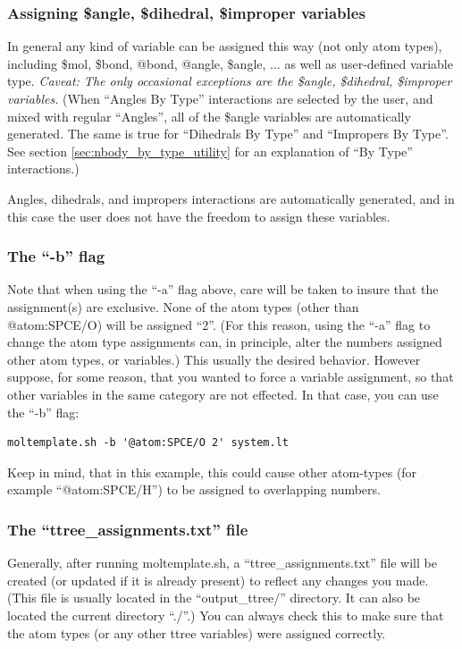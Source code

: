 \documentclass[11pt]{article}
\begin{document}
\subsubsection*{Assigning \$angle, \$dihedral, \$improper variables}
In general any kind of variable can be assigned this way (not only atom types),
including \$mol, \$bond, @bond, @angle, \$angle, ...
as well as user-defined variable type.
\textit{Caveat: The only occasional exceptions are the
\$angle, \$dihedral, \$improper variables.}
(When ``Angles By Type'' interactions are selected by the user,
and mixed with regular ``Angles'',
all of the \$angle variables are automatically generated.  
The same is true for ``Dihedrals By Type'' and ``Impropers By Type''.
See section \ref{sec:nbody_by_type_utility} for an explanation of 
``By Type'' interactions.)


Angles, dihedrals, and impropers interactions are automatically generated, and 
in this case the user does not have the freedom to assign these variables.

\subsubsection*{The ``-b'' flag}
Note that when using the ``-a'' flag above, care will be taken to 
insure that the assignment(s) are exclusive. 
None of the atom types (other than @atom:SPCE/O) will be assigned ``2''. 
(For this reason, using the ``-a'' flag to change the atom type 
 assignments can, in principle, alter the numbers assigned 
 other atom types, or variables.)
This usually the desired behavior. 
However suppose, for some reason, that you wanted to 
force a variable assignment, so that other 
variables in the same category are not effected. 
In that case, you can use the ``-b'' flag:
\begin{verbatim}
moltemplate.sh -b '@atom:SPCE/O 2' system.lt
\end{verbatim}
Keep in mind, that in this example, this could cause other atom-types 
(for example ``@atom:SPCE/H'') to be assigned to overlapping numbers. 


\subsubsection*{The ``ttree\_assignments.txt'' file}
\label{sec:ttree_assignments}
Generally, after running moltemplate.sh, a ``ttree\_assignments.txt'' 
file will be created (or updated if it is already present) 
to reflect any changes you made.  
(This file is usually located in the ``output\_ttree/'' directory.
 It can also be located the current directory ``./''.)
You can always check this to make sure that the atom types
(or any other ttree variables) were assigned correctly.
\end{document}
